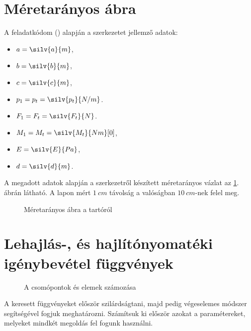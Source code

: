 \documentclass[a4paper, 12pt]{scrartcl}
\begin{document}

\allowdisplaybreaks

\section{Méretarányos ábra} %

A feladatkódom (\texttt{})
alapján a szerkezetet jellemző adatok:
\begin{multicols}{3}
  \begin{itemize}
    \item $a = \silv{a}{m}$,
    \item $b = \silv{b}{m}$,
    \item $c = \silv{c}{m}$,

    \item $p_1 = p_t = \silv{p_t}{N/m}$.
    \item $F_1 = F_t = \silv{F_t}{N}$.
    \item $M_1 = M_t = \silv{M_t}{Nm}[0]$,

    \item $\siplaces{0}\sisci{}E = \silv{E}{Pa}$,
    \item $d = \silv{d}{m}$.
  \end{itemize}
\end{multicols}

A megadott adatok alapján a szerkezetről készített méretarányos vázlat az
\ref{fig:construction}. ábrán látható. A lapon mért $\SI{1}{cm}$ távolság
a valóságban $\SI{10}{cm}$-nek felel meg.

\begin{figure}[H]
  \centering
  
  \caption{Méretarányos ábra a tartóról}
  \label{fig:construction}
\end{figure}



\section{Lehajlás-, és hajlítónyomatéki igénybevétel függvények} %

\begin{figure}[H]
  \centering
  
  \vspace{-2mm}
  \caption{A csomópontok és elemek számozása}
  \label{fig:numbering}
\end{figure}

\vspace{-2mm}
A keresett függvényeket először szilárdságtani, majd pedig végeselemes
módszer segítségével fogjuk meghatározni. Számítsuk ki először azokat a
paramétereket, melyeket mindkét megoldás fel fogunk használni.
\end{document}
